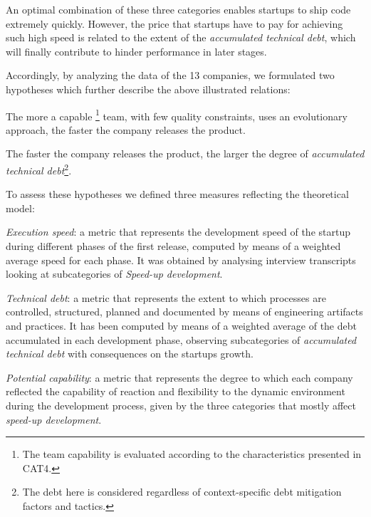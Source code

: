 \documentclass[10pt,journal,letterpaper,compsoc]{IEEEtran}
\begin{document}
An optimal combination of these three categories enables startups to ship code 
extremely quickly. However, the price that startups have to pay for achieving 
such high speed is related to the extent of the \textit{accumulated technical 
debt}, which will finally contribute to hinder performance in later stages.


Accordingly, by analyzing the data of the 13 companies, we formulated two 
hypotheses which further describe the above illustrated relations:

\begin{compactenum}
\item The more a capable \footnote{The team capability is evaluated according 
to the characteristics presented in CAT4.} team, with few quality constraints, 
uses an evolutionary approach, the faster the company releases the product.
\item The faster the company releases the product, the larger the degree of 
\textit{accumulated technical debt}\footnote{The debt here is considered 
regardless of context-specific debt mitigation factors and tactics.}.
\end{compactenum}

To assess these hypotheses we defined three measures reflecting the theoretical 
model:

\begin{compactitem}

\item \textit{Execution speed}: a metric that represents the development speed 
of the startup during different phases of the first release, computed by means 
of a weighted average speed for each phase. It was obtained by analysing 
interview transcripts looking at subcategories of \textit{Speed-up development}.

\item \textit{Technical debt}: a metric that represents the extent to which 
processes are controlled, structured, planned and documented by means of 
engineering artifacts and practices. It has been computed by means of a weighted 
average of the debt accumulated in each development phase, observing 
subcategories of  \textit{accumulated technical debt} with consequences on the 
startups growth.

\item \textit{Potential capability}: a metric that represents the degree to 
which each company reflected the capability of reaction and flexibility to the 
dynamic environment during the development process, given by the three 
categories that mostly affect \textit{speed-up development}.
\end{compactitem}
\end{document}
